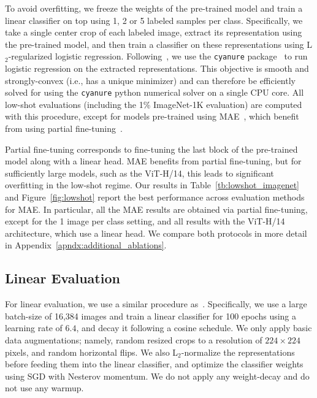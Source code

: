 \documentclass{article}
\begin{document}
To avoid overfitting, we freeze the weights of the pre-trained model and train a linear classifier on top using 1, 2 or 5 labeled samples per class.
Specifically, we take a single center crop of each labeled image, extract its representation using the pre-trained model, and then train a classifier on these representations using L$_2$-regularized logistic regression.
Following~\citep{caron2021emerging}, we use the {\tt cyanure} package~\citep{mairal2019cyanure} to run logistic regression on the extracted representations.
This objective is smooth and strongly-convex (i.e., has a unique minimizer) and can therefore be efficiently solved for using the {\tt cyanure} python numerical solver on a single CPU core. All low-shot evaluations (including the 1\% ImageNet-1K evaluation) are computed with this procedure, except for models pre-trained using MAE~\citep{he2021masked}, which benefit from using partial fine-tuning~\citep{he2021masked}.

Partial fine-tuning corresponds to fine-tuning the last block of the pre-trained model along with a linear head. MAE benefits from partial fine-tuning, but for sufficiently large models, such as the ViT-H/14, this leads to significant overfitting in the low-shot regime. Our results in Table~\ref{tb:lowshot_imagenet} and Figure~\ref{fig:lowshot} report the best performance across evaluation methods for MAE. In particular, all the MAE results are obtained via partial fine-tuning, except for the 1 image per class setting, and all results with the ViT-H/14 architecture, which use a linear head. We compare both protocols in more detail in Appendix~\ref{apndx:additional_ablations}. 

\subsection{Linear Evaluation}
For linear evaluation, we use a similar procedure as~\citet{he2021masked}.
Specifically, we use a large batch-size of 16,384 images and train a linear classifier for 100 epochs using a learning rate of $6.4$, and decay it following a cosine schedule.
We only apply basic data augmentations; namely, random resized crops to a resolution of $224\times224$ pixels, and random horizontal flips.
We also L$_2$-normalize the representations before feeding them into the linear classifier, and optimize the classifier weights using SGD with Nesterov momentum.
We do not apply any weight-decay and do not use any warmup.
\end{document}
